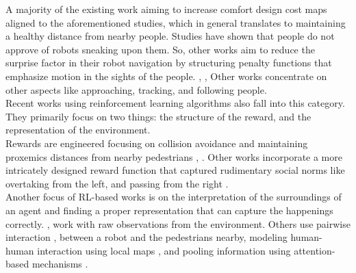 A majority of the existing work aiming to increase comfort design cost maps aligned to the aforementioned studies, which in general translates to maintaining a healthy distance from nearby people. Studies have shown that people do not approve of robots sneaking upon them. So, other works aim to reduce the surprise factor in their robot navigation by structuring penalty functions that emphasize motion in the sights of the people. \cite{pandey_2010_human_centered_nav}, \cite{scandolo_2011}, \cite{sisbot_human_2007}
Other works concentrate on other aspects like approaching, tracking, and following people.\\

Recent works using reinforcement learning algorithms also fall into this category. They primarily focus on two things: the structure of the reward, and the representation of the environment. \\

Rewards are engineered focusing on collision avoidance and maintaining proxemics distances from nearby pedestrians \cite{chen_crowd_aware_robot_nav_with_attention}, \cite{chen_decentralized_non_communication_2017}. Other works incorporate a more intricately designed reward function that captured rudimentary social norms like overtaking from the left,  and passing from the right \cite{chen_socially_2017}. \\

Another focus of RL-based works is on the interpretation of the surroundings of an agent and finding a proper representation that can capture the happenings correctly. \cite{long_2017_optimally_decentralized_collision_avoidance, tai_paolo_virtual_to_real_2017}, work with raw observations from the environment. Others use pairwise interaction \cite{chen_crowd_aware_robot_nav_with_attention}, \cite{chen_decentralized_non_communication_2017} between a robot and the pedestrians nearby, modeling human-human interaction using local maps \cite{chen_crowd_aware_robot_nav_with_attention}, and pooling information using attention-based mechanisms \cite{chen_crowd_aware_robot_nav_with_attention}.

